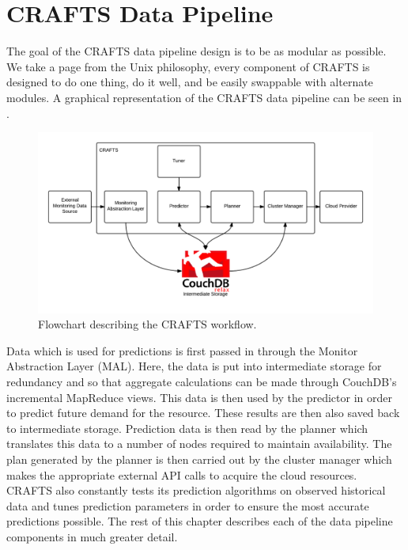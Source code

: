 \chapter{CRAFTS Data Pipeline}
\label{ch:datapipe}
The goal of the CRAFTS data pipeline design is to be as modular as possible. We take a page from the Unix philosophy, every component of CRAFTS is designed to do one thing, do it well, and be easily swappable with alternate modules. A graphical representation of the CRAFTS data pipeline can be seen in .

\begin{figure}
    \centering
      \includegraphics[width=\textwidth]{diagrams/datapipeline.png}
      \caption{Flowchart describing the CRAFTS workflow.}
      \label{fig:workflow}
\end{figure}

Data which is used for predictions is first passed in through the Monitor Abstraction Layer (\textsf{MAL}). Here, the data is put into intermediate storage for redundancy and so that aggregate calculations can be made through CouchDB's incremental MapReduce views. This data is then used by the \textsf{predictor} in order to predict future demand for the resource. These results are then also saved back to intermediate storage. Prediction data is then read by the \textsf{planner} which translates this data to a number of nodes required to maintain availability. The plan generated by the \textsf{planner} is then carried out by the \textsf{cluster manager} which makes the appropriate external API calls to acquire the cloud resources. CRAFTS also constantly tests its prediction algorithms on observed historical data and tunes prediction parameters in order to ensure the most accurate predictions possible. The rest of this chapter describes each of the data pipeline components in much greater detail.

